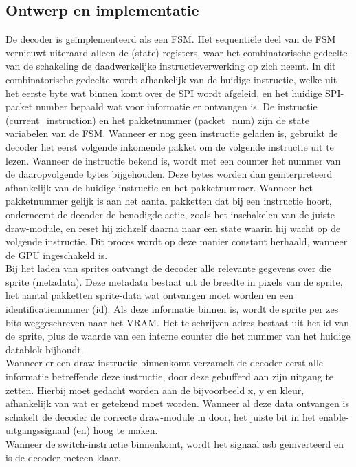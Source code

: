 \documentclass{scrartcl} %
\begin{document}
\subsection{Ontwerp en implementatie}
De decoder is geïmplementeerd als een FSM. Het sequentiële deel van de FSM vernieuwt uiteraard alleen de (state) registers, waar het combinatorische gedeelte van de schakeling de daadwerkelijke instructieverwerking op zich neemt. In dit combinatorische gedeelte wordt afhankelijk van de huidige instructie, welke uit het eerste byte wat binnen komt over de SPI wordt afgeleid, en het huidige SPI-packet number bepaald wat voor informatie er ontvangen is. De instructie (current_instruction) en het pakketnummer (packet_num) zijn de state variabelen van de FSM. Wanneer er nog geen instructie geladen is, gebruikt de decoder het eerst volgende inkomende pakket om de volgende instructie uit te lezen. Wanneer de instructie bekend is, wordt met een counter het nummer van de daaropvolgende bytes bijgehouden. Deze bytes worden dan geïnterpreteerd afhankelijk van de huidige instructie en het pakketnummer. Wanneer het pakketnummer gelijk is aan het aantal pakketten dat bij een instructie hoort, onderneemt de decoder de benodigde actie, zoals het inschakelen van de juiste draw-module, en reset hij zichzelf daarna naar een state waarin hij wacht op de volgende instructie. Dit proces wordt op deze manier constant herhaald, wanneer de GPU ingeschakeld is.
\\
Bij het laden van sprites ontvangt de decoder alle relevante gegevens over die sprite (metadata). Deze metadata bestaat uit de breedte in pixels van de sprite, het aantal pakketten sprite-data wat ontvangen moet worden en een identificatienummer (id). Als deze informatie binnen is, wordt de sprite per zes bits weggeschreven naar het VRAM. Het te schrijven adres bestaat uit het id van de sprite, plus de waarde van een interne counter die het nummer van het huidige datablok bijhoudt.
\\
Wanneer er een draw-instructie binnenkomt verzamelt de decoder eerst alle informatie betreffende deze instructie, door deze gebufferd aan zijn uitgang te zetten. Hierbij moet gedacht worden aan de bijvoorbeeld x, y en kleur, afhankelijk van wat er getekend moet worden. Wanneer al deze data ontvangen is schakelt de decoder de correcte draw-module in door, het juiste bit in het enable-uitgangssignaal (en) hoog te maken.
\\
Wanneer de switch-instructie binnenkomt, wordt het signaal asb geïnverteerd en is de decoder meteen klaar.
\\
\\
\end{document}
